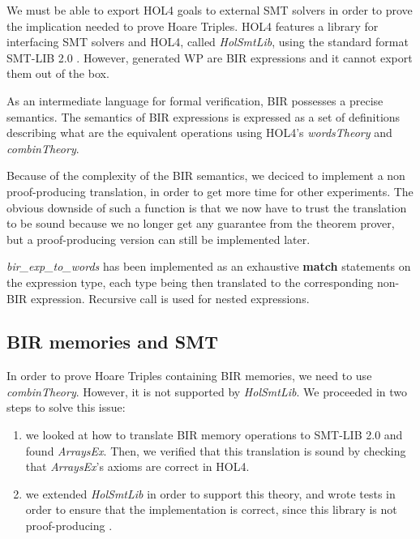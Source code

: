 \documentclass[10pt,a4paper]{article}
\begin{document}
\begin{multicols}{2}
We must be able to export HOL4 goals to external SMT solvers in order to prove the implication needed to prove Hoare Triples. HOL4 features a library for interfacing {SMT} solvers and HOL4, called \textit{HolSmtLib}, using the standard format SMT-LIB 2.0 \cite{barrett_satisfiability_2016}. However, generated WP are BIR expressions and it cannot export them out of the box.

As an intermediate language for formal verification, {BIR} possesses a precise semantics. The semantics of BIR expressions is expressed as a set of definitions describing what are the equivalent operations using HOL4's \textit{wordsTheory} and \textit{combinTheory}.

Because of the complexity of the BIR semantics, we deciced to implement a non proof-producing translation, in order to get more time for other experiments. The obvious downside of such a function is that we now have to trust the translation to be sound because we no longer get any guarantee from the theorem prover, but a proof-producing version can still be implemented later.

\textit{bir\_exp\_to\_words} has been implemented as an exhaustive \textbf{match} statements on the expression type, each type being then translated to the corresponding non-BIR expression. Recursive call is used for nested expressions.

\subsection{BIR memories and SMT} \label{bir-memories-with-smt-solvers}

In order to prove Hoare Triples containing BIR memories, we need to use \textit{combinTheory}. However, it is not supported by \textit{HolSmtLib}. We proceeded in two steps to solve this issue:

\begin{enumerate}
  \item we looked at how to translate BIR memory operations to SMT-LIB 2.0 and found \textit{ArraysEx}. Then, we verified that this translation is sound by checking that \textit{ArraysEx}'s axioms are correct in HOL4.
  \item we extended \textit{HolSmtLib} in order to support this theory, and wrote tests in order to ensure that the implementation is correct, since this library is not proof-producing \footnotemark.
\end{enumerate}



\end{multicols}
\end{document}
